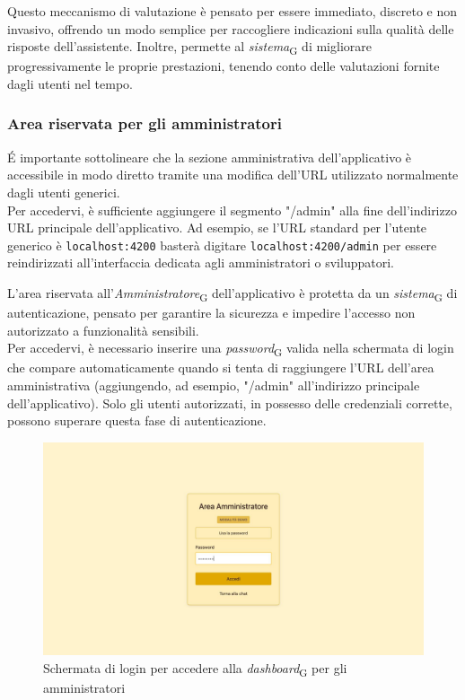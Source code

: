 Questo meccanismo di valutazione è pensato per essere immediato, discreto e non invasivo, offrendo un modo semplice per raccogliere indicazioni sulla qualità delle risposte dell’assistente. Inoltre, permette al \textit{sistema}\textsubscript{G} di migliorare progressivamente le proprie prestazioni, tenendo conto delle valutazioni fornite dagli utenti nel tempo.

\subsubsection{Area riservata per gli amministratori}
\'E importante sottolineare che la sezione amministrativa dell’applicativo è accessibile in modo diretto tramite una modifica dell’URL utilizzato normalmente dagli utenti generici. \\
Per accedervi, è sufficiente aggiungere il segmento "/admin" alla fine dell’indirizzo URL principale dell’applicativo. Ad esempio, se l’URL standard per l’utente generico è \texttt{localhost:4200} basterà digitare \texttt{localhost:4200/admin} per essere reindirizzati all’interfaccia dedicata agli amministratori o sviluppatori.

L’area riservata all’\textit{Amministratore}\textsubscript{G} dell’applicativo è protetta da un \textit{sistema}\textsubscript{G} di autenticazione, pensato per garantire la sicurezza e impedire l’accesso non autorizzato a funzionalità sensibili. \\
Per accedervi, è necessario inserire una \textit{password}\textsubscript{G} valida nella schermata di login che compare automaticamente quando si tenta di raggiungere l’URL dell’area amministrativa (aggiungendo, ad esempio, "/admin" all’indirizzo principale dell’applicativo). Solo gli utenti autorizzati, in possesso delle credenziali corrette, possono superare questa fase di autenticazione.
\begin{figure}[H]
\centering
\includegraphics[width=1\textwidth]{contents/img/login.jpg}
\caption{Schermata di login per accedere alla \textit{dashboard}\textsubscript{G} per gli amministratori}
\end{figure}


